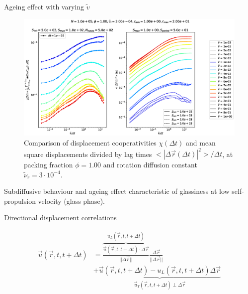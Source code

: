 \documentclass{beamer}
\begin{document}
\begin{frame}{Ageing effect with varying $\tilde{v}$}

\vspace{-0.2cm}
\begin{figure}[h!]
  \centering
  \includegraphics[width=0.8\linewidth]{intCuu_msdt_Dk8000_Rh3000_Nq1000_Io5000_Mn1000_Cn5000_RMINl1000_RMAXm2000.eps}
  \vspace{-0.2cm}
  \caption{Comparison of displacement cooperativities $\chi(\Delta t)$ and mean square displacements divided by lag times $<|\Delta\vec{r}(\Delta t)|^2>/\Delta t$, at packing fraction $\phi=1.00$ and rotation diffusion constant $\tilde{\nu}_r=3\cdot10^{-4}$.}
\end{figure}
\vspace{-0.3cm}
Subdiffusive behaviour and ageing effect characteristic of glassiness at low self-propulsion velocity (glass phase).

\end{frame}

\begin{frame}{Directional displacement correlations}


\vspace{-1cm}
\begin{align*}
\vec{u}(\vec{r}, t, t + \Delta t) &= \overbrace{\frac{\vec{u}(\vec{r}, t, t + \Delta t)\cdot\Delta\vec{r}}{||\Delta\vec{r}||}}^{\displaystyle u_L(\vec{r}, t, t + \Delta t)}\frac{\Delta\vec{r}}{||\Delta\vec{r}||}\\
&+ \underbrace{\vec{u}(\vec{r}, t, t + \Delta t) - u_L(\vec{r}, t, t + \Delta t)\Delta\vec{r}}_{\displaystyle\vec{u}_T(\vec{r}, t, t + \Delta t)\perp\Delta\vec{r}}
\end{align*}


\end{frame}
\end{document}
